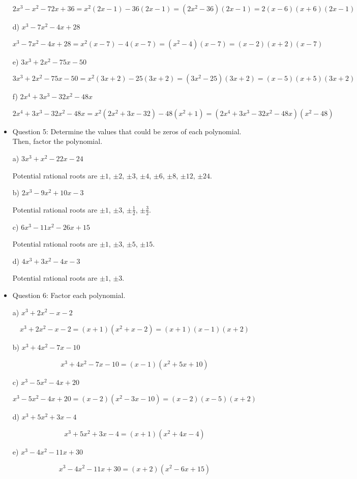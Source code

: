 \documentclass{article}
\begin{document}
\begin{itemize}
\[
2x^3 - x^2 - 72x + 36 = x^2(2x - 1) - 36(2x - 1) = (2x^2 - 36)(2x - 1) = 2(x - 6)(x + 6)(2x - 1)
\]

d) $x^3 - 7x^2 - 4x + 28$

\[
x^3 - 7x^2 - 4x + 28 = x^2(x - 7) - 4(x - 7) = (x^2 - 4)(x - 7) = (x - 2)(x + 2)(x - 7)
\]

e) $3x^3 + 2x^2 - 75x - 50$

\[
3x^3 + 2x^2 - 75x - 50 = x^2(3x + 2) - 25(3x + 2) = (3x^2 - 25)(3x + 2) = (x - 5)(x + 5)(3x + 2)
\]

f) $2x^4 + 3x^3 - 32x^2 - 48x$

\[
2x^4 + 3x^3 - 32x^2 - 48x = x^2(2x^2 + 3x - 32) - 48(x^2 + 1) = (2x^4 + 3x^3 - 32x^2 - 48x)(x^2 - 48)
\]


\item Question 5:
Determine the values that could be zeros of each polynomial. Then, factor the polynomial.

a) $3x^3+x^2-22x-24$

Potential rational roots are $\pm1$, $\pm2$, $\pm3$, $\pm4$, $\pm6$, $\pm8$, $\pm12$, $\pm24$.

b) $2x^3-9x^2+10x-3$

Potential rational roots are $\pm1$, $\pm3$, $\pm\frac{1}{2}$, $\pm\frac{3}{2}$.

c) $6x^3-11x^2-26x+15$

Potential rational roots are $\pm1$, $\pm3$, $\pm5$, $\pm15$.

d) $4x^3+3x^2-4x-3$

Potential rational roots are $\pm1$, $\pm3$.


\item Question 6:
Factor each polynomial.

a) $x^3+2x^2-x-2$

\[
x^3 + 2x^2 - x - 2 = (x + 1)(x^2 + x - 2) = (x + 1)(x - 1)(x + 2)
\]

b) $x^3+4x^2-7x-10$

\[
x^3 + 4x^2 - 7x - 10 = (x - 1)(x^2 + 5x + 10)
\]

c) $x^3-5x^2-4x+20$

\[
x^3 - 5x^2 - 4x + 20 = (x - 2)(x^2 - 3x - 10) = (x - 2)(x - 5)(x + 2)
\]

d) $x^3+5x^2+3x-4$

\[
x^3 + 5x^2 + 3x - 4 = (x + 1)(x^2 + 4x - 4)
\]

e) $x^3-4x^2-11x+30$

\[
x^3 - 4x^2 - 11x + 30 = (x + 2)(x^2 - 6x + 15)
\]


\end{itemize}
\end{document}
